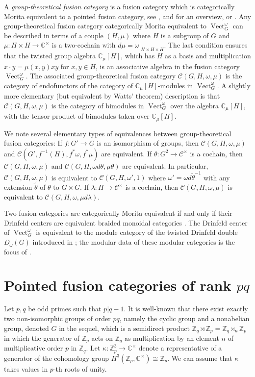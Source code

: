 \documentclass[12pt]{amsart}
\theoremstyle{remark}
\theoremstyle{definition}
\numberwithin{equation}{section}
\newcommand\inv{^{-1}}
\newcommand\Vect{\operatorname{Vect}}
\newcommand\CC{\mathbb C}
\newcommand\ZZ{\mathbb Z}
\newcommand\C{\mathcal C}
\newcommand\semidir\rtimes
\begin{document}
A \emph{group-theoretical fusion category} is a fusion category which is categorically Morita equivalent to a pointed fusion category, see \cite{MR1976459}, and \cite{MR3077244} for an overview, or \cite[9.7]{MR3242743}. Any group-theoretical fusion category categorically Morita equivalent to $\Vect_G^\omega$ can be described in terms of a couple $(H,\mu)$ where $H$ is a subgroup of $G$ and $\mu\colon H\times H\to \CC^\times$ is a two-cochain  with $d\mu=\omega|_{H\times H\times H}$. The last condition ensures that the twisted group algebra $\CC_\mu[H]$, which has $H$ as a basis and multiplication $x\cdot y=\mu(x,y)xy$ for $x,y\in H$, is an associative algebra in the fusion category $\Vect_G^\omega$. The associated group-theoretical fusion category $\C(G,H,\omega,\mu)$ is the category of endofunctors of the category of $\CC_\mu[H]$-modules in $\Vect_G^\omega$. A slightly more elementary (but equivalent by Watts' theorem) description is that $\C(G,H,\omega,\mu)$ is the category of bimodules in $\Vect^\omega_G$ over the algebra $\CC_\mu[H]$, with the tensor product of bimodules taken over $\CC_\mu[H]$.

We note several elementary types of equivalences between group-theoretical fusion categories: If $f\colon G'\to G$ is an isomorphism of groups, then $\C(G,H,\omega,\mu)$ and $\C(G',f\inv(H),f^*\omega,f^*\mu)$ are equivalent. If $\theta\colon G^2\to\C^\times$ is a cochain, then $\C(G,H,\omega,\mu)$ and $\C(G,H,\omega d\theta,\mu\theta)$ are equivalent. In particular, $\C(G,H,\omega,\mu)$ is equivalent to $\C(G,H,\omega',1)$ where $\omega'=\omega d\tilde\theta\inv$ with any extension $\tilde\theta$ of $\theta$ to $G\times G$. If $\lambda\colon H\to\C^\times$ is a cochain, then $\C(G,H,\omega,\mu)$ is equivalent to $\C(G,H,\omega,\mu d\lambda)$.

 Two fusion categories are categorically Morita equivalent if and only if their Drinfeld centers are equivalent braided monoidal categories \cite{MR2183279}. The Drinfeld center of $\Vect_G^\omega$ is equivalent to the module category of the twisted Drinfeld double $D_\omega(G)$ introduced in \cite{MR1128130}; the modular data of these modular categories is the focus of \cite{MR1770077}.
\section{Pointed fusion categories of rank $pq$}
\label{sec:pointed}

Let $p,q$ be odd primes such that $p|q-1$. It is well-known that there exist exactly two non-isomorphic groups of order $pq$, namely the cyclic group and a nonabelian group, denoted $G$ in the sequel, which is a semidirect product $\ZZ_q\semidir \ZZ_p=\ZZ_q\semidir_n \ZZ_p$ in which the generator of $\ZZ_p$ acts on $\ZZ_q$ as multiplication by an element $n$ of multiplicative order $p$ in $\ZZ_q$. Let $\kappa\colon\ZZ_p^3\to\CC^\times$ denote a representative of a generator of the cohomology group $H^3(\ZZ_p,\CC^\times)\cong \ZZ_p$. We can assume that $\kappa$ takes values in $p$-th roots of unity.
\end{document}
